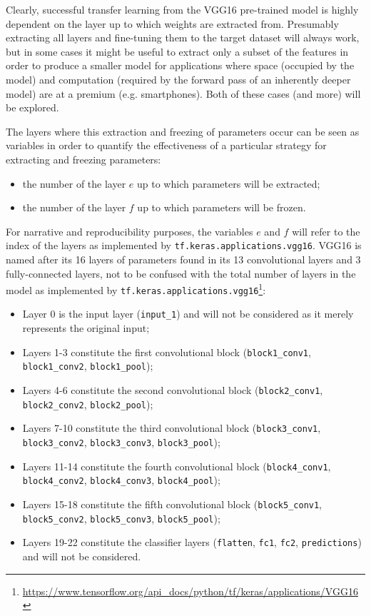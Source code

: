 Clearly, successful transfer learning from the VGG16 pre-trained model is highly dependent on the layer up to which weights are extracted from. Presumably extracting all layers and fine-tuning them to the target dataset will always work, but in some cases it might be useful to extract only a subset of the features in order to produce a smaller model for applications where space (occupied by the model) and computation (required by the forward pass of an inherently deeper model) are at a premium (e.g. smartphones). Both of these cases (and more) will be explored.

The layers where this extraction and freezing of parameters occur can be seen as variables in order to quantify the effectiveness of a particular strategy for extracting and freezing parameters:

\begin{itemize}
    \item the number of the layer $e$ up to which parameters will be extracted;
    \item the number of the layer $f$ up to which parameters will be frozen.
\end{itemize}

For narrative and reproducibility purposes, the variables $e$ and $f$ will refer to the index of the layers as implemented by \verb|tf.keras.applications.vgg16|. VGG16 is named after its 16 layers of parameters found in its 13 convolutional layers and 3 fully-connected layers, not to be confused with the total number of layers in the model as implemented by \verb|tf.keras.applications.vgg16|\footnote{\url{https://www.tensorflow.org/api_docs/python/tf/keras/applications/VGG16}}:

\begin{itemize}
    \item Layer 0 is the input layer (\verb|input_1|) and will not be considered as it merely represents the original input;
    \item Layers 1-3 constitute the first convolutional block (\verb|block1_conv1|, \verb|block1_conv2|, \verb|block1_pool|);
    \item Layers 4-6 constitute the second convolutional block (\verb|block2_conv1|, \verb|block2_conv2|, \verb|block2_pool|);
    \item Layers 7-10 constitute the third convolutional block (\verb|block3_conv1|, \verb|block3_conv2|, \verb|block3_conv3|, \verb|block3_pool|);
    \item Layers 11-14 constitute the fourth convolutional block (\verb|block4_conv1|, \verb|block4_conv2|, \verb|block4_conv3|, \verb|block4_pool|);
    \item Layers 15-18 constitute the fifth convolutional block (\verb|block5_conv1|, \verb|block5_conv2|, \verb|block5_conv3|, \verb|block5_pool|);
    \item Layers 19-22 constitute the classifier layers (\verb|flatten|, \verb|fc1|, \verb|fc2|, \verb|predictions|) and will not be considered.
\end{itemize}

